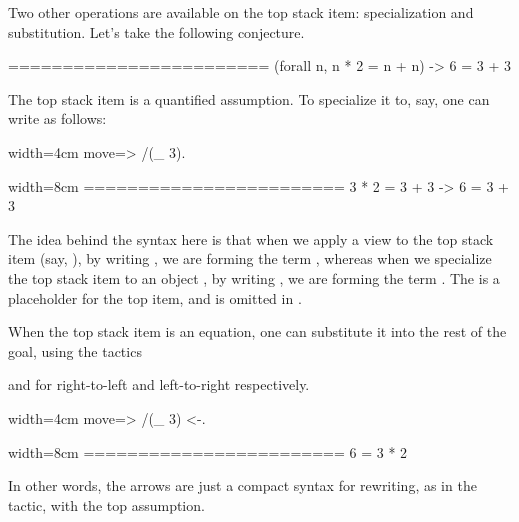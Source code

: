 Two other operations are available on the top stack item: specialization
and substitution.  Let's take the following conjecture.

\begin{coqout}{}{}
========================
(forall n, n * 2 = n + n) -> 6 = 3 + 3
\end{coqout}

The top stack item is a quantified assumption.  To specialize it to, say,
 one can write as follows:

\begin{coq-left}{}{width=4cm}
move=> /(_ 3).
$~$
\end{coq-left}
\begin{coqout-right}{}{width=8cm}
========================
3 * 2 = 3 + 3 -> 6 = 3 + 3
\end{coqout-right}

The idea behind the syntax here is that when we apply a view  to
the top stack item (say, ), by writing , we are
forming the term , whereas
when we specialize the top stack item  to an object ,
by writing , we are forming the term .  The \C{_}
is a placeholder for the top item, and is
omitted in .

When the top stack item is an equation, one can substitute it into
the rest of the goal, using the tactics \C{<-}

and \C{->} for right-to-left and left-to-right respectively.

\begin{coq-left}{}{width=4cm}
move=> /(_ 3) <-.
$~$
\end{coq-left}
\begin{coqout-right}{}{width=8cm}
========================
6 = 3 * 2
\end{coqout-right}

In other words, the arrows are just a compact syntax for rewriting,
as in the  tactic, with the top assumption.

